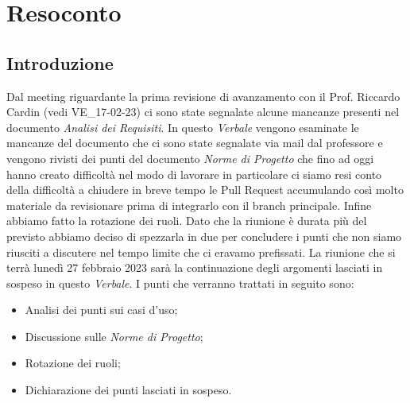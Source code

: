 \section{Resoconto}
\subsection{Introduzione}

Dal meeting riguardante la prima revisione di avanzamento con il Prof. Riccardo Cardin (vedi VE\_17-02-23) ci sono state segnalate 
alcune mancanze presenti nel documento \textit{Analisi dei Requisiti}.
In questo \textit{Verbale} vengono esaminate le mancanze del documento che ci sono state segnalate via mail dal professore e vengono rivisti dei punti del documento \textit{Norme di Progetto}
che fino ad oggi hanno creato difficoltà nel modo di lavorare in particolare ci siamo resi conto della difficoltà a chiudere in breve tempo le Pull Request
accumulando così molto materiale da revisionare prima di integrarlo con il branch principale.
Infine abbiamo fatto la rotazione dei ruoli.
 Dato che la riunione è durata più del previsto abbiamo deciso di spezzarla in due per concludere i punti che non siamo riusciti a discutere nel tempo limite che ci eravamo prefissati.
La riunione che si terrà lunedì 27 febbraio 2023 sarà la continuazione degli argomenti lasciati in sospeso in questo \textit{Verbale}.
I punti che verranno trattati in seguito sono:
\begin{itemize}
    \item Analisi dei punti sui casi d'uso;
    \item Discussione sulle \textit{Norme di Progetto};
    \item Rotazione dei ruoli;
    \item Dichiarazione dei punti lasciati in sospeso.
\end{itemize}

